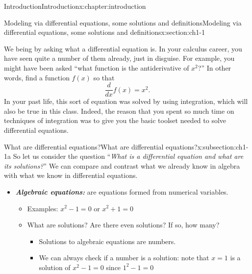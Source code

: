 \documentclass[oneside,10pt,]{book}
\newcommand{\alert}[1]{\textbf{\textit{#1}}}
\numberwithin{equation}{section}
\numberwithin{equation}{section}
\begin{document}
\begin{chapterptx}{Introduction}{}{Introduction}{}{}{x:chapter:introduction}
%
%
\typeout{************************************************}
\typeout{************************************************}
%
\begin{sectionptx}{Modeling via differential equations, some solutions and definitions}{}{Modeling via differential equations, some solutions and definitions}{}{}{x:section:ch1-1}
\begin{introduction}{}%
We being by asking what a differential equation is. In your calculus career, you have seen quite a number of them already, just in disguise. For example, you might have been asked ``what function is the antiderivative of \(x^2\)?'' In other words, find a function \(f(x)\) so that%
\begin{equation*}
\frac{d}{dx} f(x) = x^2.
\end{equation*}
In your past life, this sort of equation was solved by using integration, which will also be true in this class. Indeed, the reason that you spent so much time on techniques of integration was to give you the basic toolset needed to solve differential equations.%
\end{introduction}%
%
%
\typeout{************************************************}
\typeout{************************************************}
%
\begin{subsectionptx}{What are differential equations?}{}{What are differential equations?}{}{}{x:subsection:ch1-1a}
So let us consider the question ``\emph{What is a differential equation and what are its solutions?}'' We can compare and contrast what we already know in algebra with what we know in differential equations.%
%
\begin{itemize}[label=\textbullet]
\item{}\alert{Algebraic equations:} are equations formed from numerical variables.%
\begin{itemize}[label=$\circ$]
\item{}Examples: \(x^2 - 1 = 0\) or \(x^2 + 1 = 0\)%
\item{}What are solutions? Are there even solutions? If so, how many?%
\begin{itemize}[label=$\blacksquare$]
\item{}Solutions to algebraic equations are numbers.%
\item{}We can always check if a number is a solution: note that \(x = 1\) is a solution of \(x^2 - 1 = 0\) since \(1^2 - 1 = 0\)%

\end{itemize}
\end{itemize}
\end{itemize}
\end{subsectionptx}
\end{sectionptx}
\end{chapterptx}
\end{document}
